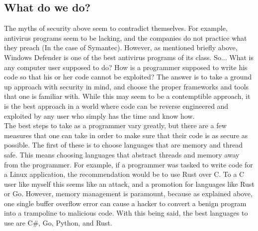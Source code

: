 \documentclass{article}
\newcommand\tab[1][1cm]{\hspace*{#1}}
\begin{document}
\subsection{What do we do?}
\tab The myths of security above seem to contradict themselves. For example, antivirus programs seem to be lacking, and the companies do not practice what they preach (In the case of Symantec). However, as mentioned briefly above, Windows Defender is one of the best antivirus programs of its class. So... What is any computer user supposed to do? How is a programmer supposed to write his code so that his or her code cannot be exploited? The answer is to take a ground up approach with security in mind, and choose the proper frameworks and tools that one is familiar with. While this may seem to be a contemptible approach, it is the best approach in a world where code can be reverse engineered and exploited by any user who simply has the time and know how.
\\
\tab The best steps to take as a programmer vary greatly, but there are a few measures that one can take in order to make sure that their code is as secure as possible. The first of these is to choose languages that are memory and thread safe. This means choosing languages that abstract threads and memory away from the programmer. For example, if a programmer was tasked to write code for a Linux application, the recommendation would be to use Rust over C. To a C user like myself this seems like an attack, and a promotion for languages like Rust or Go. However, memory management is paramount, because as explained above, one single buffer overflow error can cause a hacker to convert a benign program into a trampoline to malicious code. With this being said, the best languages to use are C#, Go, Python, and Rust.
\\
\end{document}
